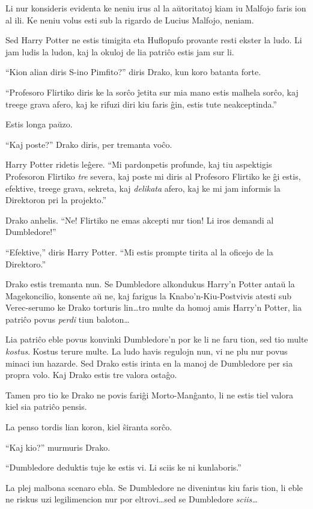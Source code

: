 Li nur konsideris evidenta ke neniu irus al la aŭtoritatoj kiam iu Malfojo faris ion al ili. Ke neniu volus esti sub la rigardo de Lucius Malfojo, neniam.

Sed Harry Potter ne estis timigita eta Huflopufo provante resti ekster la ludo. Li jam ludis la ludon, kaj la okuloj de lia patriĉo estis jam sur li. 

``Kion alian diris S-ino Pimfito?'' diris Drako, kun koro batanta forte. 

``Profesoro Flirtiko diris ke la sorĉo ĵetita sur mia mano estis
malhela sorĉo, kaj treege grava afero, kaj ke rifuzi diri kiu faris
ĝin, estis tute neakceptinda.''

Estis longa paŭzo.

``Kaj poste?'' Drako diris, per tremanta voĉo.

Harry Potter ridetis leĝere. ``Mi pardonpetis profunde, kaj tiu
aspektigis Profesoron Flirtiko \emph{tre} severa, kaj poste mi diris
al Profesoro Flirtiko ke ĝi estis, efektive, treege grava, sekreta,
kaj \emph{delikata} afero, kaj ke mi jam informis la Direktoron pri la
projekto.''

Drako anhelis. ``Ne! Flirtiko ne emas akcepti nur tion! Li iros demandi al Dumbledore!''

``Efektive,'' diris Harry Potter. ``Mi estis prompte tirita al la oficejo de la Direktoro.''

Drako estis tremanta nun. Se Dumbledore alkondukus Harry'n Potter
antaŭ la Magekoncilio, konsente aŭ ne, kaj farigus la
Knabo'n-Kiu-Postvivis atesti sub Verec-serumo ke Drako torturis
lin\ldots{}tro multe da homoj amis Harry'n Potter, lia patriĉo povus
\emph{perdi} tiun baloton\ldots

Lia patriĉo eble povus konvinki Dumbledore'n por ke li ne faru tion, sed
tio multe \emph{kostus}. Kostus terure multe. La ludo havis regulojn
nun, vi ne plu nur povus minaci iun hazarde. Sed Drako estis irinta en
la manoj de Dumbledore per sia propra volo. Kaj Drako estis tre valora
ostaĝo.

Tamen pro tio ke Drako ne povis fariĝi Morto-Manĝanto, li ne estis
tiel valora kiel sia patriĉo pensis.

La penso tordis lian koron, kiel ŝiranta sorĉo.

``Kaj kio?'' murmuris Drako.

``Dumbledore deduktis tuje ke estis vi. Li sciis ke ni kunlaboris.''

La plej malbona scenaro ebla. Se Dumbledore ne divenintus kiu faris
tion, li eble ne riskus uzi legilimencion nur por eltrovi\ldots{}sed
se Dumbledore \emph{sciis\ldots}


